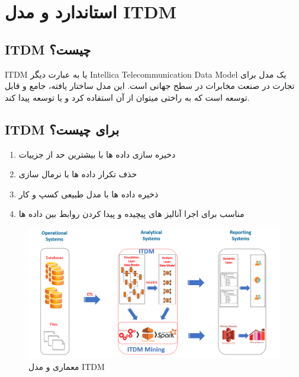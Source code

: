 \documentclass{llncs}
\begin{document}
\newpage

\section{استاندارد و مدل ITDM}
\subsection{ITDM چیست؟}
ITDM یا به عبارت دیگر Intellica Telecommunication Data Model یک مدل برای تجارت در صنعت مخابرات در سطح جهانی است. این مدل ساختار یافته، جامع و قابل توسعه است که به راختی میتوان از آن استفاده کرد و یا توسعه پیدا کند.

\subsection{ITDM برای چیست؟}
\begin{enumerate}
    \item دخیره سازی داده ها با بیشترین حد از جزییات
    \item حذف تکرار داده ها با نرمال سازی
    \item ذخیره داده ها با مدل طبیعی کسپ و کار
    \item مناسب برای اجرا آنالیز های پیچیده و پیدا کردن روابط بین داده ها
\end{enumerate}


\begin{figure}
\centering
\includegraphics[width=1\textwidth]{mahi/bi-4.png}
\centering
\caption{معماری و مدل ITDM}
\label{fig:bi-4}
\end{figure}

\newpage
\end{document}

